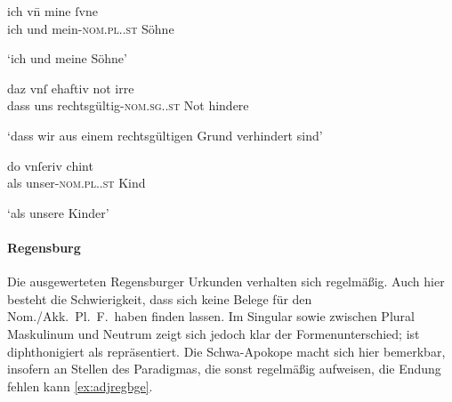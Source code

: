 \begin{exe}
\ex \label{ex:adjnuern}
	\begin{xlist}
	\ex \label{ex:adjnuern_1}
		\gll ich vn̄ mine ſvne \\
			ich und mein-\textsc{nom.pl.\MascM.st} Söhne \\
		\begin{taggedline}{\parencites(Kl.~Seligenporten, Kr.~Neumarkt in der Oberpfalz, 1299)[\pno~3428, 525.15]{cao4}}
		\trans `ich und meine Söhne'
		\end{taggedline}

	\ex \label{ex:adjnuern_2}
		\gll daz vnſ ehaftiv not irre \\
			dass uns rechtsgültig-\textsc{nom.sg.\FemI.st} Not hindere \\
		\begin{taggedline}{\parencites(Nürnberg, 1287)[\pno~949, 301.12--13]{cao2}}
		\trans `dass wir aus einem rechtsgültigen Grund verhindert sind'
		\end{taggedline}

	\ex \label{ex:adjnuern_3}
		\gll do vnſeriv chint \\
			als unser-\textsc{nom.pl.\NeutX.st} Kind \\
		\begin{taggedline}{\parencites(Nürnberg, 1294)[1972~AB.225.17--18]{cao3}}
		\trans `als unsere Kinder'
		\end{taggedline}
	\end{xlist}
\end{exe}

\paragraph{Regensburg}
\label{par:adjregensburg}
Die ausgewerteten Regensburger Urkunden verhalten sich regelmäßig. Auch hier
besteht die Schwierigkeit, dass sich keine Belege für den Nom./Akk.\ Pl.\ F.\
haben finden lassen. Im Singular sowie zwischen Plural Maskulinum und Neutrum
zeigt sich jedoch klar der Formenunterschied; \norm{iu} ist diphthonigiert als
\lit{eu} repräsentiert. Die Schwa-Apokope
\autocites{lindgren1953}[109--111]{paul2007} macht sich hier bemerkbar,
insofern an Stellen des Paradigmas, die sonst regelmäßig \norm{-e} aufweisen,
die Endung fehlen kann \cref{ex:adjregbge}.%


